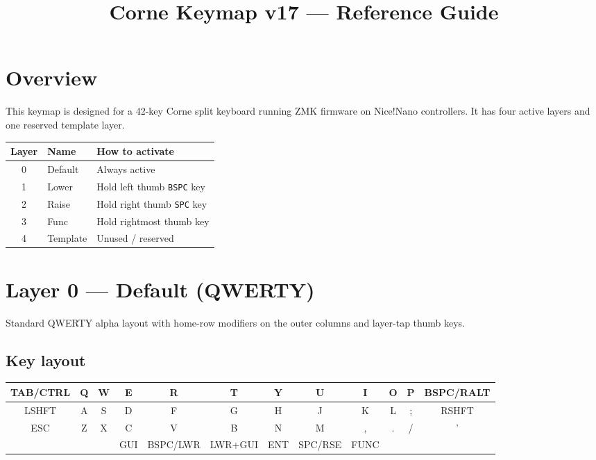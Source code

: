 \documentclass[11pt, letterpaper]{article}
\title{\textbf{Corne Keymap v17 — Reference Guide}}
\author{}
\date{}
\begin{document}
\maketitle
\tableofcontents
\newpage

\section{Overview}

This keymap is designed for a 42-key Corne split keyboard running ZMK
firmware on Nice!Nano controllers. It has four active layers and one
reserved template layer.

\begin{center}
\begin{tabular}{cll}
\toprule
\textbf{Layer} & \textbf{Name}    & \textbf{How to activate} \\
\midrule
0              & Default          & Always active \\
1              & Lower            & Hold left thumb \texttt{BSPC} key \\
2              & Raise            & Hold right thumb \texttt{SPC} key \\
3              & Func             & Hold rightmost thumb key \\
4              & Template         & Unused / reserved \\
\bottomrule
\end{tabular}
\end{center}

\section{Layer 0 — Default (QWERTY)}

Standard QWERTY alpha layout with home-row modifiers on the outer
columns and layer-tap thumb keys.

\subsection*{Key layout}

\begin{center}
\renewcommand{\arraystretch}{1.4}
\begin{tabular}{|c|c|c|c|c|c||c|c|c|c|c|c|}
\hline
TAB/CTRL & Q & W & E & R & T & Y & U & I & O & P & BSPC/RALT \\
\hline
LSHFT & A & S & D & F & G & H & J & K & L & ; & RSHFT \\
\hline
ESC & Z & X & C & V & B & N & M & , & . & / & ' \\
\hline
\multicolumn{3}{|c}{} &
GUI &
\multicolumn{1}{|c|}{BSPC/LWR} &
\multicolumn{1}{|c||}{LWR+GUI} &
\multicolumn{1}{c|}{ENT} &
\multicolumn{1}{c|}{SPC/RSE} &
\multicolumn{1}{c|}{FUNC} &
\multicolumn{3}{c}{} \\
\hline
\end{tabular}
\end{center}
\end{document}
